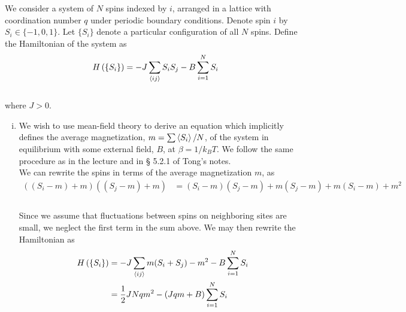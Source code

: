 \documentclass[]{article}
\begin{document}
\begin{enumerate}[1.]
We consider a system of $N$ spins indexed by $i$, arranged in a lattice with coordination number $q$ under periodic boundary conditions. Denote spin $i$ by $S_i \in \{ -1, 0 , 1\}$. Let $\{S_i\}$ denote a particular configuration of all $N$ spins. Define the Hamiltonian of the system as \\

\begin{equation}
\begin{aligned}
H \left(  \{S_i\} \right) & = -J \sum_{ \expval{ij}  } S_i S_j - B \sum_{i=1}^N S_i \\
\end{aligned}
\end{equation} \\

where $J>0$. \\



\begin{enumerate}[i.]


\item We wish to use mean-field theory to derive an equation which implicitly defines the average magnetization, $m = \sum \expval{ S_i }/N $, of the system in equilibrium with some external field, $B$, at $\beta = 1/k_B T$. We follow the same procedure as in the lecture and in § 5.2.1 of Tong's notes. \\

We can rewrite the spins in terms of the average magnetization $m$, as \\

\begin{equation}
\begin{aligned}
\left( ( S_i - m) + m \right)  \left(  (S_j - m) + m \right)  & = (S_i - m)( S_j - m ) + m(S_j - m) + m(S_i -m) + m^2 \\
\end{aligned}
\end{equation} \\

Since we assume that fluctuations between spins on neighboring sites are small, we neglect the first term in the sum above. We may then rewrite the Hamiltonian as \\

\begin{equation}
\begin{aligned}
H \left(  \{S_i\} \right) & = -J \sum_{ \expval{ij}  } m(S_i + S_j) - m^2  - B \sum_{i=1}^N S_i \\
%
& =  \frac{1}{2} J N q m^2  - (J q m  + B ) \sum_{i=1}^N S_i \\
\end{aligned}
\end{equation} \\


\end{enumerate}
\end{enumerate}
\end{document}
